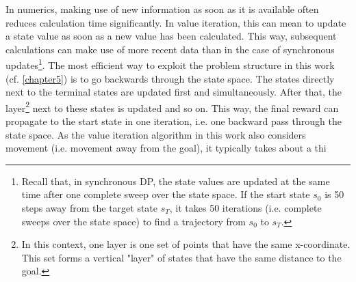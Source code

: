In numerics, making use of new information as soon as it is available often reduces calculation time significantly. In value iteration, this can mean to update a state value as soon as a new value has been calculated. This way, subsequent calculations can make use of more recent data than in the case of synchronous updates\footnote{Recall that, in synchronous DP, the state values are updated at the same time after one complete sweep over the state space. If the start state $s_0$ is 50 steps away from the target state $s_T$, it takes 50 iterations (i.e. complete sweeps over the state space) to find a trajectory from $s_0$ to $s_T$.}. The most efficient way to exploit the problem structure in this work (cf. \ref{chapter5}) is to go backwards through the state space. The states directly next to the terminal states are updated first and simultaneously. After that, the layer\footnote{In this context, one layer is one set of points that have the same x-coordinate. This set forms a vertical "layer" of states that have the same distance to the goal.} next to these states is updated and so on. This way, the final reward can propagate to the start state in one iteration, i.e. one backward pass through the state space. As the value iteration algorithm in this work also considers movement (i.e. movement away from the goal), it typically takes about a thi